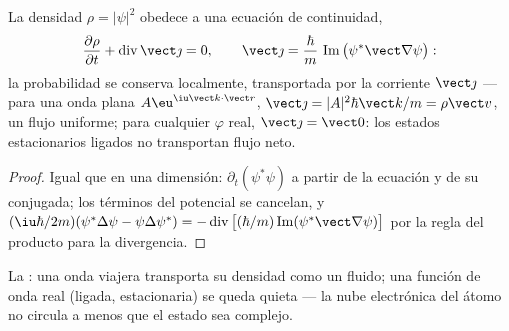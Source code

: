 \begin{proposition}\label{prop:b3:schrodinger-three-dimensions:current}
La densidad $\rho = |\psi|^2$ obedece a una ecuación de continuidad,
\[
\frac{\partial\rho}{\partial t} + \operatorname{div}\vect\jmath = 0 ,
\qquad
\vect\jmath = \frac{\hbar}{m}\,
\operatorname{Im}\big(\psi^*\vect\nabla\psi\big) :
\]
la probabilidad se conserva localmente, transportada por la corriente
$\vect\jmath$ --- para una onda plana $A\eu^{\iu\vect k\cdot\vect r}$,
$\vect\jmath = |A|^2\hbar\vect k/m = \rho\vect v$, un flujo uniforme;
para cualquier $\varphi$ real, $\vect\jmath = \vect 0$: los estados
estacionarios ligados no transportan flujo neto.
\end{proposition}

\begin{proof}
Igual que en una dimensión: $\partial_t(\psi^*\psi)$ a partir de la ecuación
y de su conjugada; los términos del potencial se cancelan, y $(\iu\hbar/2m)
(\psi^*\Delta\psi - \psi\Delta\psi^*) =
-\operatorname{div}\big[(\hbar/m)\operatorname{Im}(\psi^*\vect\nabla
\psi)\big]$ por la regla del producto para la divergencia.
\end{proof}

\begin{omfigure}

{\small La : una onda viajera transporta su
densidad como un fluido; una función de onda real (ligada, estacionaria) se
queda quieta --- la nube electrónica del átomo no circula a menos que el
estado sea complejo.}
\end{omfigure}

